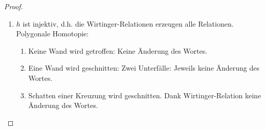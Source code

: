 \begin{st}[Wirtinger, <1900]
\begin{proof}
\begin{enumerate}[1),start=0]
                Wir nutzen die polygonale Fundamentalgruppe (mittels polygonaler Approximation)
                \begin{math}
                    \pi_1(\R^3 \setminus K, *)
                    = \frac{\Set{\text{Schleifen}}}{\text{Homotopie}}
                    = \frac{\Set{\text{polygonale Schleifen}}}{\text{polygonale Homotopie}}.
                \end{math}
                Ohne Einschränkung betrachten wir also polygonale Schleifen $\gamma$ in $\R^3 \setminus K$.
                Zu zeigen ist $\gamma \homotopic \gamma_{i_1}^{e_1} \dotsb \gamma_{i_l}^{e_l}$.
                Trick: Betrachte den „Schatten“ des Knotens $K \subset \R^3$ unter senkrecht von oben einfallendem Licht.
                Genauer: Zu $K \subset \R^3$ ist der Schatten $\hat K = \Set{(x,y,z) \in \R^3 & \exists z' \ge z: (x,y,z') \in K}$.
                Dies ist die Vereinigung über alle Schatten $\hat A$ der Kanten $A$ von $K$.
                \begin{prop}
                    Es gilt $\R^3 \setminus \hat K \homequiv *$
                    \begin{proof}
                        Übung: explizite Formel, vgl. Sternförmig bei Zentralprojektion.
                    \end{proof}
                \end{prop}
                Ablesen an $w = [\gamma]$ eines Wortes in $w_i = [\gamma_i]$.
                Wir nehmen an, dass $\gamma$ die Wände $\hat A$ transversal im Inneren trifft.
                Jeder Durchgang liefert einen Erzeuger $w_i^{\pm 1}$.
                Damit gilt $\gamma = \gamma_{i_1}^{e_1} \dotsb \gamma_{i_l}^{e_l}$.
            \item
                $h$ ist injektiv, d.h. die Wirtinger-Relationen erzeugen alle Relationen.
                Polygonale Homotopie:
                \begin{enumerate}[1)]
                    \item
                        Keine Wand wird getroffen: Keine Änderung des Wortes.
                    \item
                        Eine Wand wird geschnitten:
                        Zwei Unterfälle: Jeweils keine Änderung des Wortes.
                    \item
                        Schatten einer Kreuzung wird geschnitten.
                        Dank Wirtinger-Relation keine Änderung des Wortes.
                \end{enumerate}
        \end{enumerate}
    \end{proof}
\end{st}



